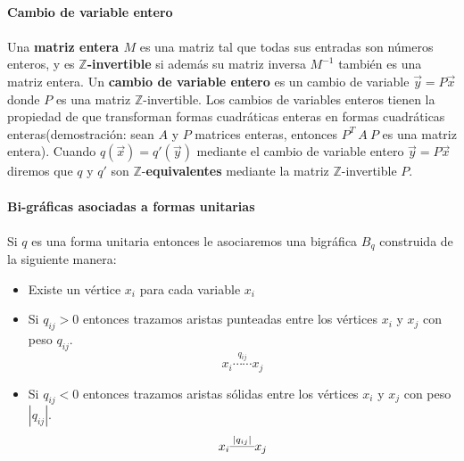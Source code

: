 \paragraph*{}
\textbf{Cambio de variable entero}

\paragraph*{}
Una \textbf{matriz entera $M$} es una matriz tal que todas sus entradas son números enteros, y es $\mathbb{Z}$\textbf{-invertible} si además su matriz inversa $M^{-1}$ también es una matriz entera. Un \textbf{cambio de variable entero} es un cambio de variable $\overrightarrow{y} = P\overrightarrow{x}$ donde $P$ es una matriz $\mathbb{Z}$-invertible. Los cambios de variables enteros tienen la propiedad de que transforman formas cuadráticas enteras en formas cuadráticas enteras(demostración: sean $A$ y $P$ matrices enteras, entonces $P^{T}~A~P$ es una matriz entera). Cuando $q(\overrightarrow{x}) = q'(\overrightarrow{y})$ mediante el cambio de variable entero $\overrightarrow{y} = P\overrightarrow{x}$ diremos que $q$ y $q'$ son $\mathbb{Z}$-\textbf{equivalentes} mediante la matriz $\mathbb{Z}$-invertible $P$.

\paragraph*{}
\textbf{Bi-gráficas asociadas a formas unitarias}

\paragraph*{}
Si $q$ es una forma unitaria entonces le asociaremos una bigráfica \textbf{$B$}$_{q}$ construida de la siguiente manera:

\begin{itemize}
    \item Existe un vértice $x_{i}$ para cada variable $x_{i}$
    \item Si $q_{ij} > 0$ entonces trazamos aristas punteadas entre los vértices $x_{i}$ y $x_{j}$ con peso $q_{ij}$.$$x_{i}\overset{q_{ij}}{\cdots\cdots}x_{j}$$
    
    \item Si $q_{ij} < 0$ entonces trazamos aristas sólidas entre los vértices $x_{i}$ y $x_{j}$ con peso $|q_{ij}|$.$$x_{i}\overset{|q_{ij}|}{\rule[1mm]{7mm}{0.1mm}}x_{j}$$
\end{itemize}

